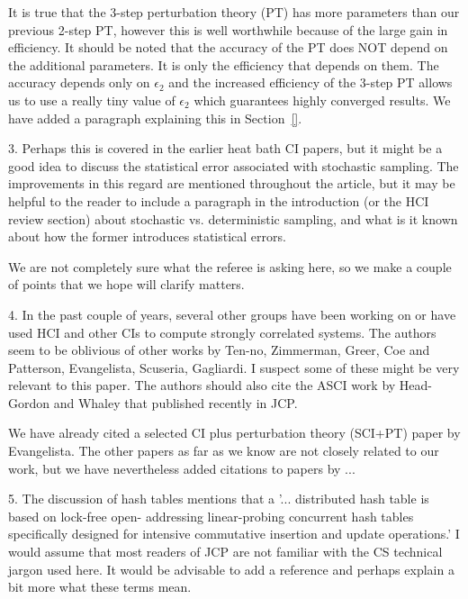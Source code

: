 \documentclass[
reprint,
 superscriptaddress,
 amsmath,amssymb,
 aps,
]{revtex4-1}
\begin{document}
It is true that the 3-step perturbation theory (PT) has more parameters than our previous 2-step PT, however this is well worthwhile
because of the large gain in efficiency.  It should be noted that the accuracy of the PT does NOT depend on the additional parameters.
It is only the efficiency that depends on them.  The accuracy depends only on $\epsilon_2$ and the increased efficiency of the 3-step PT
allows us to use a really tiny value of $\epsilon_2$ which guarantees highly converged results.  We have added a paragraph explaining
this in Section~\ref{}.

{\color{blue}
3. Perhaps this is covered in the earlier heat bath CI papers, but it might be a good idea to discuss the statistical error associated with stochastic sampling. The improvements in this regard are mentioned throughout the article, but it may be helpful to the reader to include a paragraph in the introduction (or the HCI review section) about stochastic vs. deterministic sampling, and what is it known about how the former introduces statistical errors.
}\color{black}

We are not completely sure what the referee is asking here, so we make a couple of points that we hope will clarify matters.


{\color{blue}

4. In the past couple of years, several other groups have been working on or have used HCI and other CIs to compute strongly correlated systems. The authors seem to be oblivious of other works by Ten-no, Zimmerman, Greer, Coe and Patterson, Evangelista, Scuseria, Gagliardi. I suspect some of these might be very relevant to this paper. The authors should also cite the ASCI work by Head-Gordon and Whaley that published recently in JCP.
}\color{black}

We have already cited a selected CI plus perturbation theory (SCI+PT) paper by Evangelista.  The other papers as far as we know are not
closely related to our work, but we have nevertheless added citations to papers by ...

{\color{blue}

5. The discussion of hash tables mentions that a '... distributed hash table is based on lock-free open- addressing linear-probing concurrent hash tables specifically designed for intensive commutative insertion and update operations.' I would assume that most readers of JCP are not familiar with the CS technical jargon used here. It would be advisable to add a reference and perhaps explain a bit more what these terms mean.
}\color{black}
\end{document}
